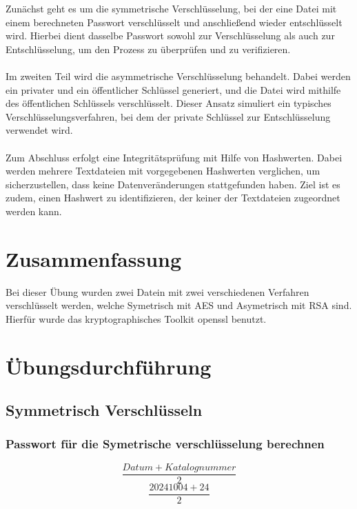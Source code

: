 \documentclass[a4paper]{article}
\begin{document}
Zunächst geht es um die symmetrische Verschlüsselung, bei der eine Datei mit einem berechneten Passwort verschlüsselt und anschließend wieder entschlüsselt wird. Hierbei dient dasselbe Passwort sowohl zur Verschlüsselung als auch zur Entschlüsselung, um den Prozess zu überprüfen und zu verifizieren.
\\\\
Im zweiten Teil wird die asymmetrische Verschlüsselung behandelt. Dabei werden ein privater und ein öffentlicher Schlüssel generiert, und die Datei wird mithilfe des öffentlichen Schlüssels verschlüsselt. Dieser Ansatz simuliert ein typisches Verschlüsselungsverfahren, bei dem der private Schlüssel zur Entschlüsselung verwendet wird.
\\\\
Zum Abschluss erfolgt eine Integritätsprüfung mit Hilfe von Hashwerten. Dabei werden mehrere Textdateien mit vorgegebenen Hashwerten verglichen, um sicherzustellen, dass keine Datenveränderungen stattgefunden haben. Ziel ist es zudem, einen Hashwert zu identifizieren, der keiner der Textdateien zugeordnet werden kann.

\section{Zusammenfassung}

Bei dieser Übung wurden zwei Datein mit zwei verschiedenen Verfahren verschlüsselt werden, welche Symetrisch mit AES und Asymetrisch mit RSA sind. Hierfür wurde das kryptographisches Toolkit openssl benutzt.

\newpage

\section{Übungsdurchführung}
\subsection{Symmetrisch Verschlüsseln}
\subsubsection{ Passwort für die Symetrische verschlüsselung berechnen}
$$\frac{Datum+Katalognummer}{2}$$
$$\frac{20241004+24}{2}$$
\end{document}
